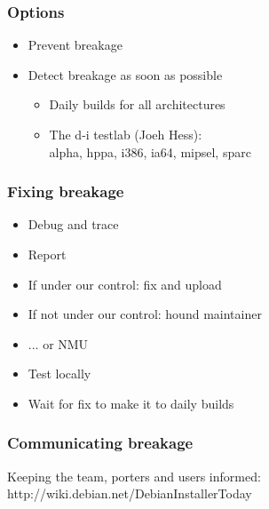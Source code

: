 \documentclass{beamer}
\begin{document}
\begin{frame}
  \frametitle{Options}
	\begin{itemize}[<+->]
	\item
		Prevent breakage
	\item
		Detect breakage as soon as possible
		\begin{itemize}
		\item
			Daily builds for all architectures
		\item
			The d-i testlab (Joeh Hess): \\
			alpha, hppa, i386, ia64, mipsel, sparc
		\end{itemize}
	\end{itemize}
\end{frame}

\begin{frame}
  \frametitle{Fixing breakage}
	\begin{itemize}[<+->]
	\item
		Debug and trace
	\item
		Report
	\item
		If under our control: fix and upload
	\item
		If not under our control: hound maintainer
	\item
		... or NMU
	\item
		Test locally
	\item
		Wait for fix to make it to daily builds
	\end{itemize}
\end{frame}

\begin{frame}
  \frametitle{Communicating breakage}
	\item
		Keeping the team, porters and users informed: \\
		http://wiki.debian.net/DebianInstallerToday
\end{frame}
\end{document}
